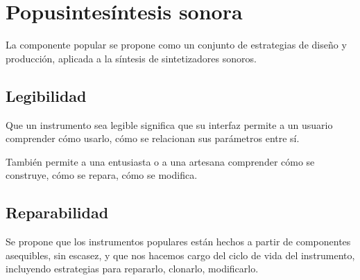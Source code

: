 \documentclass[../candidatura.tex]{subfiles}
\begin{document}
\section{Popusintesíntesis sonora}

La componente popular se propone como un conjunto de estrategias de diseño y producción, aplicada a la síntesis de sintetizadores sonoros.

\subsection{Legibilidad}

Que un instrumento sea legible significa que su interfaz permite a un usuario comprender cómo usarlo, cómo se relacionan sus parámetros entre sí.

También permite a una entusiasta o a una artesana comprender cómo se construye, cómo se repara, cómo se modifica. 

\subsection{Reparabilidad}

Se propone que los instrumentos populares están hechos a partir de componentes asequibles, sin escasez, y que nos hacemos cargo del ciclo de vida del instrumento, incluyendo estrategias para repararlo, clonarlo, modificarlo.


\newpage
\end{document}
